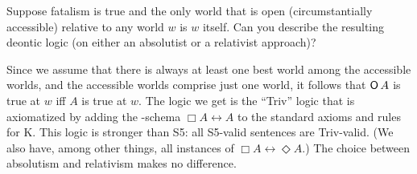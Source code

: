 \begin{exercise}
  Suppose fatalism is true and the only world that is open (circumstantially
  accessible) relative to any world $w$ is $w$ itself. Can you describe the
  resulting deontic logic (on either an absolutist or a relativist approach)?
\end{exercise}
\begin{solution}
  Since we assume that there is always at least one best world among the
  accessible worlds, and the accessible worlds comprise just one world, it
  follows that $\operatorname{\mathsf{O}} A$ is true at $w$ iff $A$ is true at $w$. The logic we get
  is the ``Triv'' logic that is axiomatized by adding the -schema
  $\Box A \leftrightarrow A$ to the standard axioms and rules for K. This logic
  is stronger than S5: all S5-valid sentences are Triv-valid. (We also have,
  among other things, all instances of $\Box A \leftrightarrow \Diamond A$.) The
  choice between absolutism and relativism makes no difference.
\end{solution}



